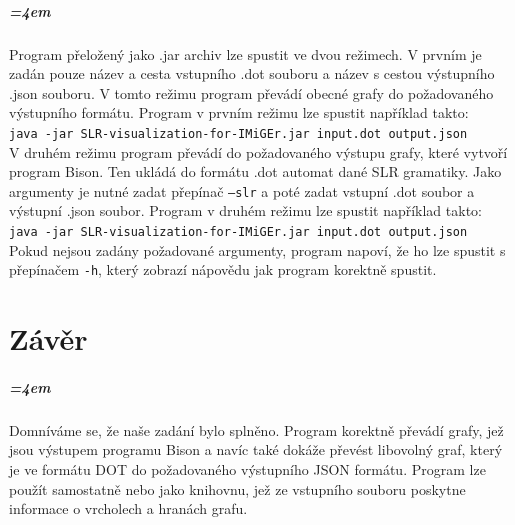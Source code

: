 \documentclass[
12pt,
a4paper,
pdftex,
czech,
titlepage
]{report}
\begin{document}
\paragraph{\parindent=4em}{
Program přeložený jako .jar archiv lze spustit ve dvou režimech. V prvním je zadán pouze název a cesta vstupního .dot souboru a název s cestou výstupního .json souboru. V tomto režimu program převádí obecné grafy do požadovaného výstupního formátu. Program v prvním režimu lze spustit například takto:\\
\texttt{java -jar SLR-visualization-for-IMiGEr.jar input.dot output.json}\\


V druhém režimu program převádí do požadovaného výstupu grafy, které vytvoří program Bison. Ten ukládá do formátu .dot automat dané SLR gramatiky. Jako argumenty je nutné zadat přepínač \texttt{--slr} a poté zadat vstupní .dot soubor a výstupní .json soubor. Program v druhém režimu lze spustit například takto:\\
\texttt{java -jar SLR-visualization-for-IMiGEr.jar input.dot output.json}\\


Pokud nejsou zadány požadované argumenty, program napoví, že ho lze spustit s přepínačem \texttt{-h}, který zobrazí nápovědu jak program korektně spustit.
}

\chapter{Závěr}
\paragraph{\parindent=4em}{
Domníváme se, že naše zadání bylo splněno. Program korektně převádí grafy, jež jsou výstupem programu Bison a navíc také dokáže převést libovolný graf, který je ve formátu DOT do požadovaného výstupního JSON formátu. Program lze použít samostatně nebo jako knihovnu, jež ze vstupního souboru poskytne informace o vrcholech a hranách grafu.
}
\end{document}
